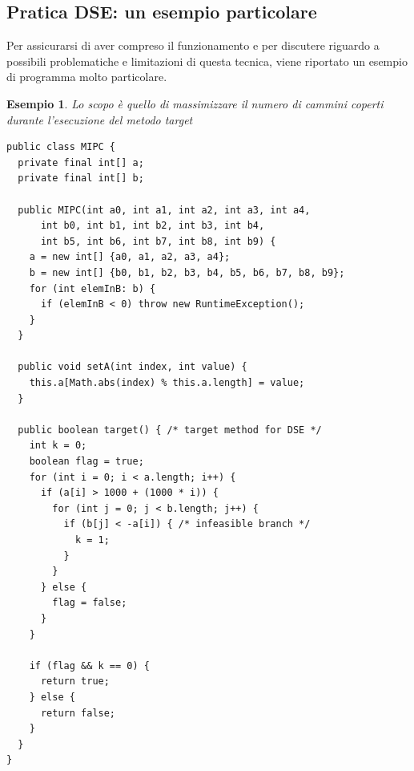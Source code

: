 \documentclass[a4paper, 12pt, oneside]{book}
\theoremstyle{normal}
\newtheorem{esempio}{Esempio}
\begin{document}
\subsection{Pratica DSE: un esempio particolare}
Per assicurarsi di aver compreso il funzionamento e per discutere riguardo a possibili problematiche e limitazioni di questa tecnica, viene riportato un esempio di programma molto particolare.

\clearpage
\begin{esempio}\label{example:mipc}
\textit{Lo scopo è quello di massimizzare il numero di cammini coperti durante l'esecuzione del metodo target}
\begin{lstlisting}
public class MIPC {
  private final int[] a;
  private final int[] b;
  
  public MIPC(int a0, int a1, int a2, int a3, int a4, 
      int b0, int b1, int b2, int b3, int b4, 
      int b5, int b6, int b7, int b8, int b9) {
    a = new int[] {a0, a1, a2, a3, a4};
    b = new int[] {b0, b1, b2, b3, b4, b5, b6, b7, b8, b9};
    for (int elemInB: b) {
      if (elemInB < 0) throw new RuntimeException();
    }
  }
  
  public void setA(int index, int value) {
    this.a[Math.abs(index) % this.a.length] = value;
  }
  
  public boolean target() { /* target method for DSE */
    int k = 0;
    boolean flag = true;
    for (int i = 0; i < a.length; i++) {
      if (a[i] > 1000 + (1000 * i)) {
        for (int j = 0; j < b.length; j++) {
          if (b[j] < -a[i]) { /* infeasible branch */
            k = 1;
          }
        }
      } else {
        flag = false;
      }
    }
    
    if (flag && k == 0) {
      return true;
    } else {
      return false;
    }
  }
}
\end{lstlisting}
\end{esempio}
\end{document}
